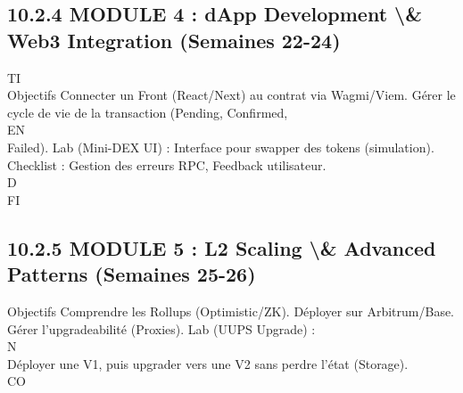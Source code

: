 \documentclass[12pt,landscape,a4paper]{article}
\begin{document}
\subsection{10.2.4 MODULE 4 : dApp Development \textbackslash{}& Web3 Integration (Semaines 22-24)}
\vspace{0.5em}
\vspace{0.5em}
\vspace{0.5em}
\vspace{0.5em}
TI\\
Objectifs Connecter un Front (React/Next) au contrat via Wagmi/Viem. Gérer le cycle de vie de la transaction (Pending, Confirmed,\\
\vspace{0.5em}
\vspace{0.5em}
\vspace{0.5em}
\vspace{0.5em}
EN\\
Failed). Lab (Mini-DEX UI) : Interface pour swapper des tokens (simulation). Checklist : Gestion des erreurs RPC, Feedback utilisateur.\\
\vspace{0.5em}
\vspace{0.5em}
\vspace{0.5em}
\vspace{0.5em}
D\\
FI\\
\subsection{10.2.5 MODULE 5 : L2 Scaling \textbackslash{}& Advanced Patterns (Semaines 25-26)}
Objectifs Comprendre les Rollups (Optimistic/ZK). Déployer sur Arbitrum/Base. Gérer l’upgradeabilité (Proxies). Lab (UUPS Upgrade) :\\
N\\
Déployer une V1, puis upgrader vers une V2 sans perdre l’état (Storage).\\
CO\\
\end{document}
